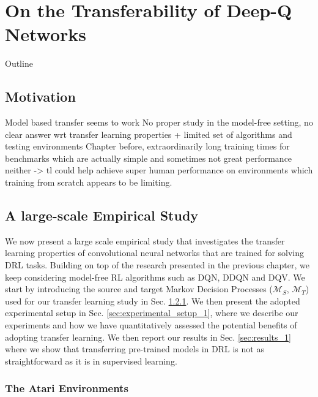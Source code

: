 
\chapter{On the Transferability of Deep-Q Networks} %
\label{ch:dqn_transfer} %

\begin{remark}{Outline}
\end{remark}


\section{Motivation}





Model based transfer seems to work
No proper study in the model-free setting, no clear answer wrt transfer learning properties + limited set of algorithms and testing environments
Chapter before, extraordinarily long training times for benchmarks which are actually simple and sometimes not great performance neither -> tl could help achieve super human performance on environments which training from scratch appears to be limiting.


\section{A large-scale Empirical Study}
\label{sec:empirical_study}

We now present a large scale empirical study that investigates the transfer learning properties of convolutional neural networks that are trained for solving DRL tasks. Building on top of the research presented in the previous chapter, we keep considering model-free RL algorithms such as DQN, DDQN and DQV. We start by introducing the source and target Markov Decision Processes ($\mathcal{M}_S$, $\mathcal{M}_T$) used for our transfer learning study in Sec. \ref{sec:atari_environments}. We then present the adopted experimental setup in Sec. \ref{sec:experimental_setup_1}, where we describe our experiments and how we have quantitatively assessed the potential benefits of adopting transfer learning. We then report our results in Sec. \ref{sec:results_1} where we show that transferring pre-trained models in DRL is not as straightforward as it is in supervised learning. 


\subsection{The Atari Environments}
\label{sec:atari_environments}

